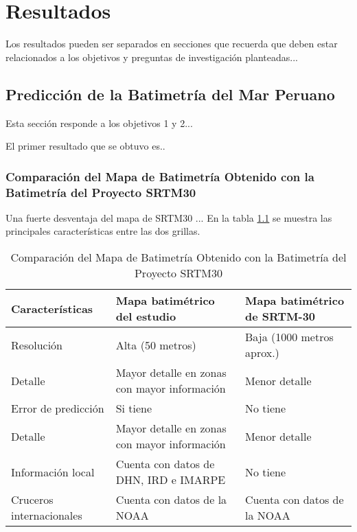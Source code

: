 \chapter{Resultados}
\thispagestyle{empty}

Los resultados pueden ser separados en secciones que recuerda que deben estar relacionados a los objetivos y preguntas de investigación planteadas...

\section{Predicción de la Batimetría del Mar Peruano}

Esta sección responde a los objetivos 1 y 2...

El primer resultado que se obtuvo es..


\subsection{Comparación del Mapa de Batimetría Obtenido con la Batimetría del Proyecto SRTM30}


 Una fuerte desventaja del mapa de SRTM30 ... En la tabla \ref{tab:comp_bathy_srtm} se muestra las principales características entre las dos grillas.
 
\begin{table}[H]\footnotesize
\caption{Comparación del Mapa de Batimetría Obtenido con la Batimetría del Proyecto SRTM30}
\centering
\begin{tabular}{ |l|l|l| }
\hline
\textbf{ Características} & \textbf{Mapa batimétrico del estudio} & \textbf{Mapa batimétrico de SRTM-30} \\ \hline \hline
Resolución & Alta (50 metros) & Baja (1000 metros aprox.) \\ \hline
Detalle & Mayor detalle en zonas con mayor información & Menor detalle \\ \hline
Error de predicción & Si tiene & No tiene \\ \hline
Detalle & Mayor detalle en zonas con mayor información & Menor detalle \\ \hline
Información local & Cuenta con datos de DHN, IRD e IMARPE & No tiene \\ \hline
Cruceros internacionales & Cuenta con datos de la NOAA & Cuenta con datos de la NOAA \\ \hline 
\end{tabular}
\label{tab:comp_bathy_srtm}
\end{table}

